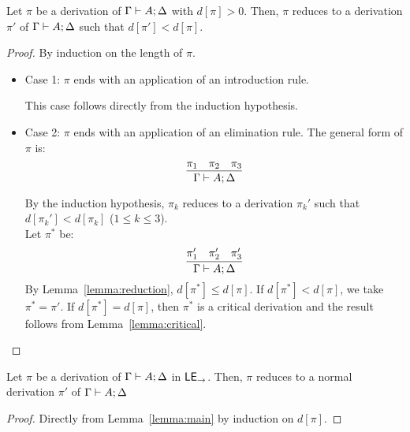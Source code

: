 \begin{lemma}\label{lemma:main}
  Let $\pi$ be a derivation of $\Gamma\vdash A;\Delta$ with $d[\pi]>0$.
  Then, $\pi$ reduces to a derivation $\pi'$ of $\Gamma\vdash A;\Delta$ such that $d[\pi'] < d[\pi]$.
\end{lemma}
\begin{proof}
  By induction on the length of $\pi$.
  \begin{itemize}
  \item Case 1: $\pi$ ends with an application of an introduction rule.
    
    This case follows directly from the induction hypothesis.
    
  \item Case 2: $\pi$ ends with an application of an elimination rule. The general form of $\pi$ is:
    \[\infer{\stp{\Gamma}{A}{\Delta}}{\pi_1& \pi_2& \pi_3}\]
    
    By the induction hypothesis, $\pi_k$ reduces to a derivation $\pi_k'$ such that $d[\pi_k'] < d[\pi_k]$ ($1 \leq k \leq 3$).\\
    Let $\pi^*$ be:
    \[\infer{\stp{\Gamma}{A}{\Delta}}{\pi_1'& \pi_2'& \pi_3'}\]
    By Lemma~\ref{lemma:reduction}, $d[\pi^*]\leq d[\pi]$. If $d[\pi^*]<d[\pi]$, we take $\pi^* = \pi'$. If $d[\pi^*] = d[\pi]$, then $\pi^*$ is a critical derivation and the result follows from Lemma~\ref{lemma:critical}.
  \end{itemize}
\end{proof}

\begin{theorem}
  Let $\pi$ be a derivation of $\Gamma\vdash A;\Delta$ in $\mathsf{LE}_{\to}$. Then, $\pi$ reduces to a normal derivation $\pi'$ of $\Gamma\vdash A;\Delta$
\end{theorem}
\begin{proof}
  Directly from Lemma~\ref{lemma:main} by induction on $d[\pi]$.
\end{proof}